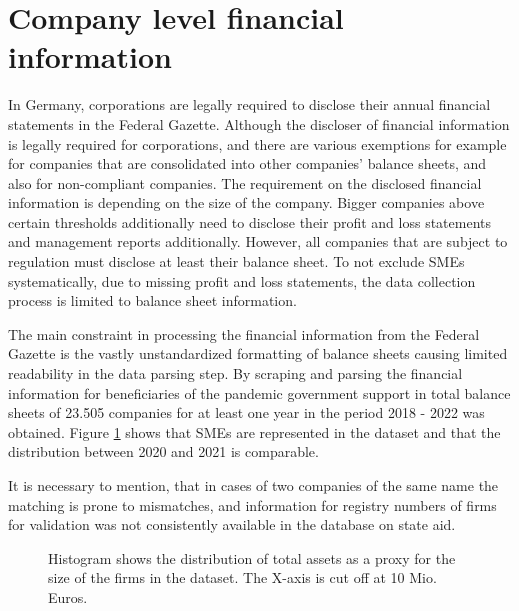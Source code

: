 \section{Company level financial information}

In Germany, corporations are legally required to disclose their annual financial statements in the Federal Gazette. Although the discloser of financial information is legally required for corporations, and there are various exemptions for example for companies that are consolidated into other companies' balance sheets, and also for non-compliant companies.
The requirement on the disclosed financial information is depending on the size of the company. Bigger companies above certain thresholds additionally need to disclose their profit and loss statements and management reports additionally. However, all companies that are subject to regulation must disclose at least their balance sheet. 
To not exclude SMEs systematically, due to missing profit and loss statements, the data collection process is limited to balance sheet information. 

The main constraint in processing the financial information from the Federal Gazette is the vastly unstandardized formatting of balance sheets causing limited readability in the data parsing step. By scraping and parsing the financial information for beneficiaries of the pandemic government support in total balance sheets of 23.505 companies for at least one year in the period 2018 - 2022 was obtained. Figure \ref{fig:FirmSizes} shows that SMEs are represented in the dataset and that the distribution between 2020 and 2021 is comparable.

It is necessary to mention, that in cases of two companies of the same name the matching is prone to mismatches, and information for registry numbers of firms for validation was not consistently available in the database on state aid.

\begin{figure}
    \centering
    
    \decoRule
    \caption[Firm size distribution in dataset]{Histogram shows the distribution of total assets as a proxy for the size of the firms in the dataset. The X-axis is cut off at 10 Mio. Euros.}
    \label{fig:FirmSizes}
\end{figure}


